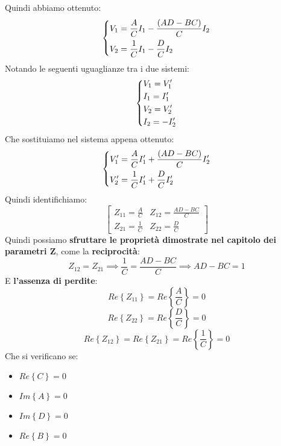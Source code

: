 Quindi abbiamo ottenuto:
\begin{equation*}
    \begin{dcases}
        V_1 = \frac{A}{C} I_1 - \frac{(AD - BC)}{C} I_2\\
        V_2 = \frac{1}{C} I_1 - \frac{D}{C} I_2
    \end{dcases}
\end{equation*}
Notando le seguenti uguaglianze tra i due sistemi:
\begin{equation*}
    \begin{dcases}
        V_1 = V'_1\\
        I_1 = I'_1\\
        V_2 = V'_2\\
        I_2 = - I'_2
    \end{dcases}
\end{equation*}
Che sostituiamo nel sistema appena ottenuto:
\begin{equation*}
    \begin{dcases}
        V'_1 = \frac{A}{C} I'_1 + \frac{(AD - BC)}{C} I'_2\\
        V'_2 = \frac{1}{C} I'_1 + \frac{D}{C} I'_2
    \end{dcases}
\end{equation*}
Quindi identifichiamo:
\begin{equation*}
    \begin{bmatrix}
        Z_{11} = \frac{A}{C} & Z_{12} = \frac{AD-BC}{C}\\
        Z_{21} = \frac{1}{C} & Z_{22} = \frac{D}{C}
    \end{bmatrix}
\end{equation*}
Quindi possiamo \textbf{sfruttare le proprietà dimostrate nel capitolo dei parametri Z}, come la \textbf{reciprocità}:
\begin{equation*}
    Z_{12} = Z_{21} \implies \frac{1}{C} = \frac{AD-BC}{C} \implies AD - BC = 1
\end{equation*}
E \textbf{l'assenza di perdite}:
\begin{equation*}
    Re\left\{Z_{11}\right\} = Re\left\{\frac{A}{C}\right\} = 0
\end{equation*}
\begin{equation*}
    Re\left\{Z_{22}\right\} = Re\left\{\frac{D}{C}\right\} = 0
\end{equation*}
\begin{equation*}
    Re\left\{Z_{12}\right\} =  Re\left\{Z_{21}\right\} = Re\left\{\frac{1}{C}\right\} = 0
\end{equation*}
Che si verificano se:
\begin{itemize}
    \item $Re\left\{C\right\} = 0$
    \item $Im\left\{A\right\} = 0$
    \item $Im\left\{D\right\} = 0$
    \item $Re\left\{B\right\} = 0$
\end{itemize}